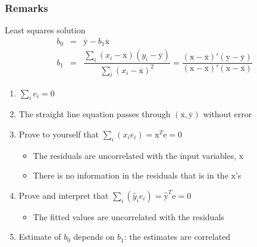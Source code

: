 \begin{frame}\frametitle{Remarks}
	\begin{block}{Least squares solution}
		$$
			\begin{array}{rcl}
				b_0 &=& \overline{\mathrm{y}} - b_1\overline{\mathrm{x}} \\
				b_1 &=& \dfrac{ \sum_i{\left(x_i - \overline{\mathrm{x}}\right)\left(y_i - \overline{\mathrm{y}}\right) } }{ \sum_i{\left( x_i - \overline{\mathrm{x}}\right)^2} } = \dfrac{\left(\mathrm{x} - \overline{\mathrm{x}}\right)'\left(\mathrm{y} - \overline{\mathrm{y}}\right)}{\left(\mathrm{x} - \overline{\mathrm{x}}\right)'\left(\mathrm{x} - \overline{\mathrm{x}}\right)}
			\end{array}
		$$
	\end{block}
	\begin{enumerate}
		\item	$\sum_i{e_i} = 0$
		\item	The straight line equation passes through $(\overline{\mathrm{x}}, \overline{\mathrm{y}})$ without error
		\item	Prove to yourself that $\sum_i{(x_i e_i)} = \mathrm{x}^T\mathrm{e} = 0$
		\begin{itemize}
			\item	The residuals are uncorrelated with the input variables, $\mathrm{x}$
			\item	There is no information in the residuals that is in the $\mathrm{x}$'s
		\end{itemize}
		\item	Prove and interpret that $\sum_i{(\hat{y}_i e_i)} = \hat{\mathrm{y}}^T\mathrm{e} = 0$
		\begin{itemize}
			\item	The fitted values are uncorrelated with the residuals
		\end{itemize}
		\item	Estimate of $b_0$ depends on $b_1$: the estimates are correlated
	\end{enumerate}
\end{frame}

